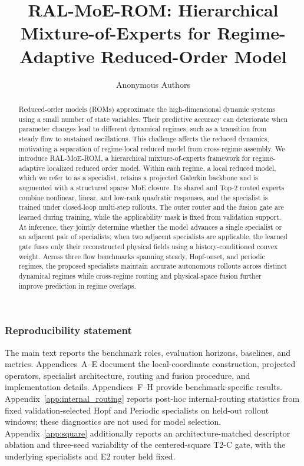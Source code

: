 \documentclass{article}
\title{RAL-MoE-ROM: Hierarchical Mixture-of-Experts for Regime-Adaptive  Reduced-Order Model }
\author{Anonymous Authors}
\begin{document}
\raggedbottom

\maketitle

\begin{abstract}
Reduced-order models (ROMs)  approximate the high-dimensional dynamic systems using a small number of state variables.  Their predictive accuracy can deteriorate when parameter changes lead to different dynamical regimes, such as a transition from steady flow to sustained oscillations. This challenge affects the reduced dynamics, motivating a separation of regime-local reduced model from cross-regime assembly.  We introduce RAL-MoE-ROM, a hierarchical mixture-of-experts framework for regime-adaptive  localized reduced order model. Within each regime, a local reduced model, which we refer to as a specialist, retains a projected Galerkin backbone and is augmented with a structured sparse MoE closure. Its shared and Top-2 routed experts combine nonlinear, linear, and low-rank quadratic responses, and the specialist is trained under closed-loop multi-step rollouts.  The outer router and the fusion gate are learned during training, while the applicability mask is fixed from validation support. At inference, they jointly determine whether the model advances a single specialist or an adjacent pair of specialists; when two adjacent specialists are applicable, the learned gate fuses only their reconstructed physical fields using a history-conditioned convex weight. Across three flow  benchmarks spanning steady, Hopf-onset, and periodic regimes, the proposed specialists maintain accurate autonomous rollouts across distinct dynamical regimes while cross-regime routing and physical-space fusion further improve prediction in regime overlaps.
\end{abstract}





\FloatBarrier


\subsubsection*{Reproducibility statement}
The main text reports the benchmark roles, evaluation horizons, baselines, and metrics. Appendices~A--E document the local-coordinate construction, projected operators, specialist architecture, routing and fusion procedure, and implementation details. Appendices~F--H provide benchmark-specific results.
Appendix~\ref{app:internal_routing} reports post-hoc internal-routing statistics
from fixed validation-selected Hopf and Periodic specialists on held-out
rollout windows; these diagnostics are not used for model selection.
Appendix~\ref{app:square} additionally reports an architecture-matched descriptor
ablation and three-seed variability of the centered-square T2-C gate, with the
underlying specialists and E2 router held fixed.
\end{document}
